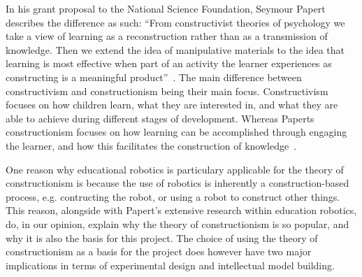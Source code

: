 \bigskip\noindent
In his grant proposal to the National Science Foundation, Seymour Papert describes the difference as such:  ``From constructivist theories of psychology we take a view of learning as a reconstruction rather than as a transmission of knowledge. Then we extend the idea of manipulative materials to the idea that learning is most effective when part of an activity the learner experiences as constructing is a meaningful product''~\cite{papertGrant}. 
The main difference between constructivism and constructionism being their main focus. Constructivism focuses on how children learn, what they are interested in, and what they are able to achieve during different stages of development. Whereas Paperts constructionism focuses on how learning can be accomplished through engaging the learner, and how this facilitates the construction of knowledge~\cite{ackermann2001piaget}.



\bigskip\noindent
One reason why educational robotics is particulary applicable for the theory of constructionism is because the use of robotics is inherently a construction-based process, e.g. contructing the robot, or using a robot to construct other things. This reason, alongside with Papert's extensive research within education robotics, do, in our opinion, explain why the theory of constructionism is so popular, and why it is also the basis for this project. 
The choice of using the theory of constructionism as a basis for the project does however have two major implications in terms of experimental design and intellectual model building. 

